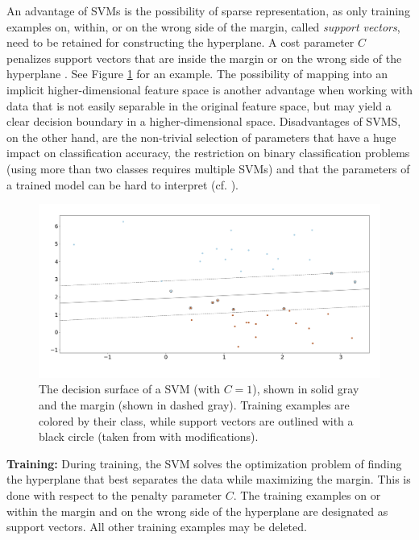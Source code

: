 \documentclass[
	ruledheaders=chapter,
	class=report,
	thesis={type=master, department=inf},
	accentcolor=1c,
	custommargins=true,
	marginpar=false,
	parskip=half-,
	fontsize=11pt,
]{tudapub}
\begin{document}
	An advantage of SVMs is the possibility of sparse representation, as only training examples on, within, or on the wrong side of the margin, called \textit{support vectors}, need to be retained for constructing the hyperplane. A cost parameter $C$ penalizes support vectors that are inside the margin or on the wrong side of the hyperplane \cite{Boser1992,Cortes1995}. See Figure \ref{fig:svm} for an example. The possibility of mapping into an implicit higher-dimensional feature space is another advantage when working with data that is not easily separable in the original feature space, but may yield a clear decision boundary in a higher-dimensional space. Disadvantages of SVMS, on the other hand, are the non-trivial selection of parameters that have a huge impact on classification accuracy, the restriction on binary classification problems (using more than two classes requires multiple SVMs) and that the parameters of a trained model can be hard to interpret (cf. \cite{Meyer2003}).
	
	\begin{figure}[tb]
		\centering
		\includegraphics[width=\textwidth]{svm.png}
		\caption{The decision surface of a SVM (with $C = 1$), shown in solid gray and the margin (shown in dashed gray). Training examples are colored by their class, while support vectors are outlined with a black circle (taken from \cite{sklearn-linearSvc} with modifications).}
		\label{fig:svm}
	\end{figure}

	\textbf{Training:} During training, the SVM solves the optimization problem of finding the hyperplane that best separates the data while maximizing the margin. This is done with respect to the penalty parameter $C$. The training examples on or within the margin and on the wrong side of the hyperplane are designated as support vectors. All other training examples may be deleted.
	
\end{document}
